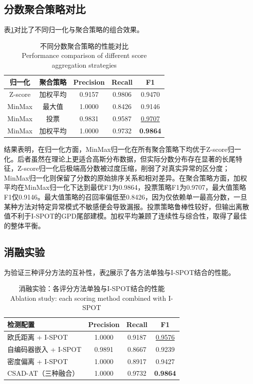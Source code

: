 \documentclass[10.5pt,a4paper,twocolumn]{ctexart}
\newcommand{\bicaption}[2]{%
  \caption{#1\\{\small #2}}%
}
\begin{document}
\subsection{分数聚合策略对比}

表\ref{tab:agg_compare}对比了不同归一化与聚合策略的组合效果。

\begin{table}[htbp]
    \centering
    \bicaption{不同分数聚合策略的性能对比}{Performance comparison of different score aggregation strategies}
    \label{tab:agg_compare}
    \begin{tabular}{ccccc}
        \toprule
        归一化 & 聚合策略 & Precision & Recall & F1 \\
        \midrule
        Z-score & 加权平均 & 0.9157 & 0.9806 & 0.9470 \\
        MinMax  & 最大值   & 1.0000 & 0.8426 & 0.9146 \\
        MinMax  & 投票     & 0.9831 & 0.9587 & \underline{0.9707} \\
        MinMax  & 加权平均 & 1.0000 & 0.9732 & \textbf{0.9864} \\
        \bottomrule
    \end{tabular}
\end{table}

结果表明，在归一化方面，MinMax归一化在所有聚合策略下均优于Z-score归一化。后者虽然在理论上更适合高斯分布数据，但实际分数分布存在显著的长尾特征，Z-score归一化后极端高分数被过度压缩，削弱了对真实异常的区分度；MinMax归一化则保留了分数的原始排序关系和相对差异。在聚合策略方面，加权平均在MinMax归一化下达到最优F1为0.9864，投票策略F1为0.9707，最大值策略F1仅0.9146。最大值策略的召回率偏低至0.8426，因为仅依赖单一最高分数，一旦某种方法对特定异常模式不敏感便会导致漏报。投票策略鲁棒性较好，但输出离散值不利于I-SPOT的GPD尾部建模。加权平均兼顾了连续性与综合性，取得了最佳的整体平衡。

\subsection{消融实验}

为验证三种评分方法的互补性，表\ref{tab:ablation}展示了各方法单独与I-SPOT结合的性能。

\begin{table}[htbp]
    \centering
    \bicaption{消融实验：各评分方法单独与I-SPOT结合的性能}{Ablation study: each scoring method combined with I-SPOT}
    \label{tab:ablation}
    \begin{tabular}{lccc}
        \toprule
        检测配置 & Precision & Recall & F1 \\
        \midrule
        欧氏距离 + I-SPOT     & 1.0000 & 0.9187 & \underline{0.9576} \\
        自编码器嵌入 + I-SPOT  & 0.9891 & 0.8667 & 0.9239 \\
        密度偏离 + I-SPOT      & 1.0000 & 0.8917 & 0.9427 \\
        \midrule
        CSAD-AT（三种融合）    & 1.0000 & 0.9732 & \textbf{0.9864} \\
        \bottomrule
    \end{tabular}
\end{table}
\end{document}
